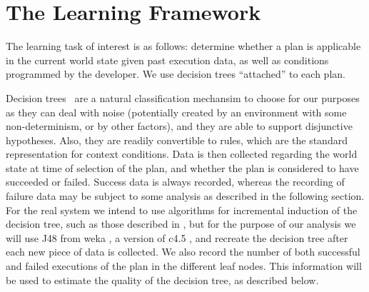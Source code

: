 \section{The Learning Framework}\label{sec:framework}

The learning task of interest is as follows: determine whether a plan is applicable in the
current world state given past execution data, as well as conditions programmed by the developer.
We use decision trees ``attached'' to each plan.

Decision trees~\cite{Mitchell97:ML} are a natural classification
mechansim to choose for our purposes as they can deal with noise
(potentially created by an environment with some non-determinism, or
by other factors), and they are able to support disjunctive
hypotheses. Also, they are readily convertible to rules, which are the
standard representation for context conditions.  Data is then
collected regarding the world state at time of selection of the plan,
and whether the plan is considered to have succeeded or
failed. Success data is always recorded, whereas the recording of
failure data may be subject to some analysis as described in the
following section. For the real system we intend to use algorithms for
incremental induction of the decision tree, such as those described in
\cite{Swere06:Fast,Utgoff97Decision}, but for the purpose of our analysis we will use
\textsf{J48} from \textsf{weka} \cite{weka99}, a version of \textsf{c4.5} \cite{Mitchell97:ML}, and
recreate the decision tree after each new piece of data is collected.  We also record the number of
both successful and failed executions of the plan in the different leaf nodes. This
information will be used to estimate the quality of the decision tree, as described below. 




